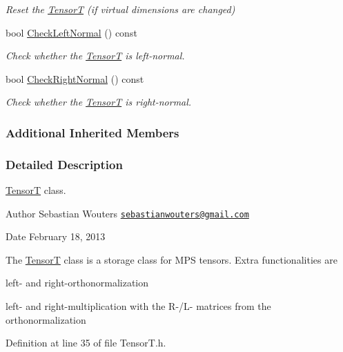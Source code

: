 \begin{DoxyCompactItemize}
\begin{DoxyCompactList}\small\item\em Reset the \hyperlink{classCheMPS2_1_1TensorT}{Tensor\-T} (if virtual dimensions are changed) \end{DoxyCompactList}\item 
bool \hyperlink{classCheMPS2_1_1TensorT_a2d9f4127678d9c52388ccf26f7ebe775}{Check\-Left\-Normal} () const 
\begin{DoxyCompactList}\small\item\em Check whether the \hyperlink{classCheMPS2_1_1TensorT}{Tensor\-T} is left-\/normal. \end{DoxyCompactList}\item 
bool \hyperlink{classCheMPS2_1_1TensorT_a734f76ffa266908bd522fd1d11d4c699}{Check\-Right\-Normal} () const 
\begin{DoxyCompactList}\small\item\em Check whether the \hyperlink{classCheMPS2_1_1TensorT}{Tensor\-T} is right-\/normal. \end{DoxyCompactList}\end{DoxyCompactItemize}
\subsubsection*{Additional Inherited Members}


\subsubsection{Detailed Description}
\hyperlink{classCheMPS2_1_1TensorT}{Tensor\-T} class. \begin{DoxyAuthor}{Author}
Sebastian Wouters \href{mailto:sebastianwouters@gmail.com}{\tt sebastianwouters@gmail.\-com} 
\end{DoxyAuthor}
\begin{DoxyDate}{Date}
February 18, 2013
\end{DoxyDate}
The \hyperlink{classCheMPS2_1_1TensorT}{Tensor\-T} class is a storage class for M\-P\-S tensors. Extra functionalities are
\begin{DoxyItemize}
\item left-\/ and right-\/orthonormalization
\item left-\/ and right-\/multiplication with the R-\//\-L-\/ matrices from the orthonormalization 
\end{DoxyItemize}

Definition at line 35 of file Tensor\-T.\-h.



